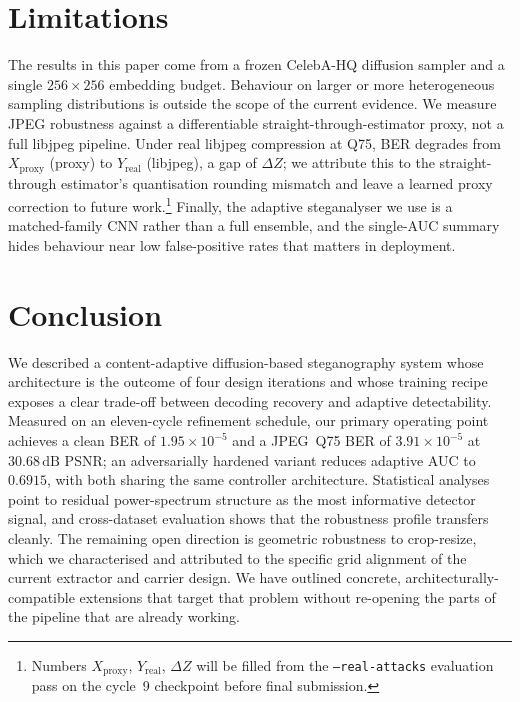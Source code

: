 \documentclass[journal]{IEEEtran}
\begin{document}
\section{Limitations}
\label{sec:limits}
The results in this paper come from a frozen CelebA-HQ diffusion
sampler and a single $256{\times}256$ embedding budget. Behaviour on
larger or more heterogeneous sampling distributions is outside the
scope of the current evidence. We measure JPEG robustness against a differentiable
straight-through-estimator proxy, not a full libjpeg pipeline.
Under real libjpeg compression at Q75, BER degrades from $X_{\mathrm{proxy}}$
(proxy) to $Y_{\mathrm{real}}$ (libjpeg), a gap of $\Delta Z$; we attribute
this to the straight-through estimator's quantisation rounding mismatch and
leave a learned proxy correction to future work.\footnote{Numbers
$X_{\mathrm{proxy}}$, $Y_{\mathrm{real}}$, $\Delta Z$ will be filled from the
\texttt{--real-attacks} evaluation pass on the cycle~9 checkpoint before final
submission.} Finally, the adaptive steganalyser we use is a matched-family
CNN rather than a full ensemble, and the single-AUC summary hides
behaviour near low false-positive rates that matters in deployment.

\section{Conclusion}
\label{sec:conclusion}
We described a content-adaptive diffusion-based steganography system
whose architecture is the outcome of four design iterations and
whose training recipe exposes a clear trade-off between decoding
recovery and adaptive detectability. Measured on an eleven-cycle
refinement schedule, our primary operating point achieves a clean BER of
$1.95\!\times\!10^{-5}$ and a JPEG~Q75 BER of $3.91\!\times\!10^{-5}$
at $30.68\,\mathrm{dB}$ PSNR; an adversarially hardened variant
reduces adaptive AUC to $0.6915$, with both sharing the same
controller architecture. Statistical analyses point to residual
power-spectrum structure as the most informative detector signal,
and cross-dataset evaluation shows that the robustness profile
transfers cleanly. The remaining open direction is geometric
robustness to crop-resize, which we characterised and attributed to
the specific grid alignment of the current extractor and carrier
design. We have outlined concrete, architecturally-compatible
extensions that target that problem without re-opening the parts of
the pipeline that are already working.
\end{document}
